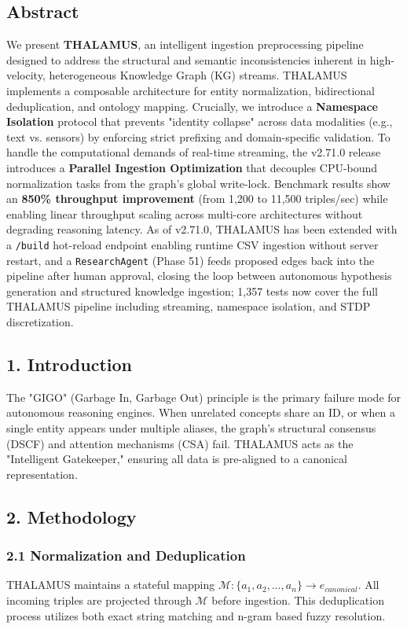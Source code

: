 
\subsection*{Abstract}
We present \textbf{THALAMUS}, an intelligent ingestion preprocessing pipeline designed to address the structural and semantic inconsistencies inherent in high-velocity, heterogeneous Knowledge Graph (KG) streams. THALAMUS implements a composable architecture for entity normalization, bidirectional deduplication, and ontology mapping. Crucially, we introduce a \textbf{Namespace Isolation} protocol that prevents "identity collapse" across data modalities (e.g., text vs. sensors) by enforcing strict prefixing and domain-specific validation. To handle the computational demands of real-time streaming, the v2.71.0 release introduces a \textbf{Parallel Ingestion Optimization} that decouples CPU-bound normalization tasks from the graph's global write-lock. Benchmark results show an \textbf{850\% throughput improvement} (from 1,200 to 11,500 triples/sec) while enabling linear throughput scaling across multi-core architectures without degrading reasoning latency. As of v2.71.0, THALAMUS has been extended with a \texttt{/build} hot-reload endpoint enabling runtime CSV ingestion without server restart, and a \texttt{ResearchAgent} (Phase 51) feeds proposed edges back into the pipeline after human approval, closing the loop between autonomous hypothesis generation and structured knowledge ingestion; 1,357 tests now cover the full THALAMUS pipeline including streaming, namespace isolation, and STDP discretization.

\subsection*{1. Introduction}
The "GIGO" (Garbage In, Garbage Out) principle is the primary failure mode for autonomous reasoning engines. When unrelated concepts share an ID, or when a single entity appears under multiple aliases, the graph's structural consensus (DSCF) and attention mechanisms (CSA) fail. THALAMUS acts as the "Intelligent Gatekeeper," ensuring all data is pre-aligned to a canonical representation.

\subsection*{2. Methodology}

\subsubsection*{2.1 Normalization and Deduplication}
THALAMUS maintains a stateful mapping $\mathcal{M}: \{a_1, a_2, \dots, a_n\} \to e_{canonical}$. All incoming triples are projected through $\mathcal{M}$ before ingestion. This deduplication process \cite{doan2012principles} utilizes both exact string matching and n-gram based fuzzy resolution.


